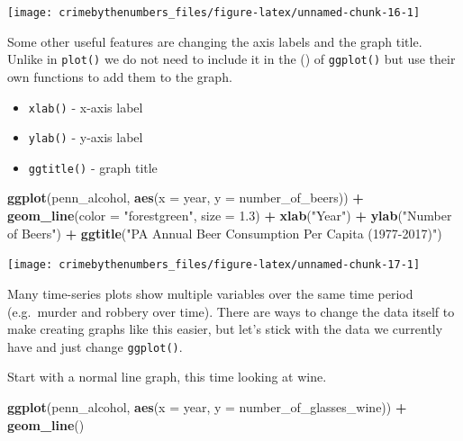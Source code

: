 \documentclass[
  12pt,
]{book}
\newenvironment{Shaded}{\begin{snugshade}}{\end{snugshade}}
\newcommand{\DataTypeTok}[1]{\textcolor[rgb]{0.27,0.27,0.27}{#1}}
\newcommand{\FloatTok}[1]{\textcolor[rgb]{0.06,0.06,0.06}{#1}}
\newcommand{\KeywordTok}[1]{\textcolor[rgb]{0.27,0.27,0.27}{\textbf{#1}}}
\newcommand{\NormalTok}[1]{#1}
\newcommand{\OperatorTok}[1]{\textcolor[rgb]{0.43,0.43,0.43}{\textbf{#1}}}
\newcommand{\StringTok}[1]{\textcolor[rgb]{0.5,0.5,0.5}{#1}}
\providecommand{\tightlist}{%
  \setlength{\itemsep}{0pt}\setlength{\parskip}{0pt}}
\begin{document}
\begin{center}\texttt{[image: crimebythenumbers\_files/figure-latex/unnamed-chunk-16-1]} \end{center}

Some other useful features are changing the axis labels and the graph title. Unlike in \texttt{plot()} we do not need to include it in the () of \texttt{ggplot()} but use their own functions to add them to the graph.

\begin{itemize}
\tightlist
\item
  \texttt{xlab()} - x-axis label
\item
  \texttt{ylab()} - y-axis label
\item
  \texttt{ggtitle()} - graph title
\end{itemize}

\begin{Shaded}
\begin{Highlighting}[]
\KeywordTok{ggplot}\NormalTok{(penn\_alcohol, }\KeywordTok{aes}\NormalTok{(}\DataTypeTok{x =}\NormalTok{ year, }\DataTypeTok{y =}\NormalTok{ number\_of\_beers)) }\OperatorTok{+}
\StringTok{  }\KeywordTok{geom\_line}\NormalTok{(}\DataTypeTok{color =} \StringTok{"forestgreen"}\NormalTok{, }\DataTypeTok{size =} \FloatTok{1.3}\NormalTok{) }\OperatorTok{+}
\StringTok{  }\KeywordTok{xlab}\NormalTok{(}\StringTok{"Year"}\NormalTok{) }\OperatorTok{+}
\StringTok{  }\KeywordTok{ylab}\NormalTok{(}\StringTok{"Number of Beers"}\NormalTok{) }\OperatorTok{+}
\StringTok{  }\KeywordTok{ggtitle}\NormalTok{(}\StringTok{"PA Annual Beer Consumption Per Capita (1977{-}2017)"}\NormalTok{)}
\end{Highlighting}
\end{Shaded}

\begin{center}\texttt{[image: crimebythenumbers\_files/figure-latex/unnamed-chunk-17-1]} \end{center}

Many time-series plots show multiple variables over the same time period (e.g.~murder and robbery over time). There are ways to change the data itself to make creating graphs like this easier, but let's stick with the data we currently have and just change \texttt{ggplot()}.

Start with a normal line graph, this time looking at wine.

\begin{Shaded}
\begin{Highlighting}[]
\KeywordTok{ggplot}\NormalTok{(penn\_alcohol, }\KeywordTok{aes}\NormalTok{(}\DataTypeTok{x =}\NormalTok{ year, }\DataTypeTok{y =}\NormalTok{ number\_of\_glasses\_wine)) }\OperatorTok{+}
\StringTok{  }\KeywordTok{geom\_line}\NormalTok{()}
\end{Highlighting}
\end{Shaded}
\end{document}
